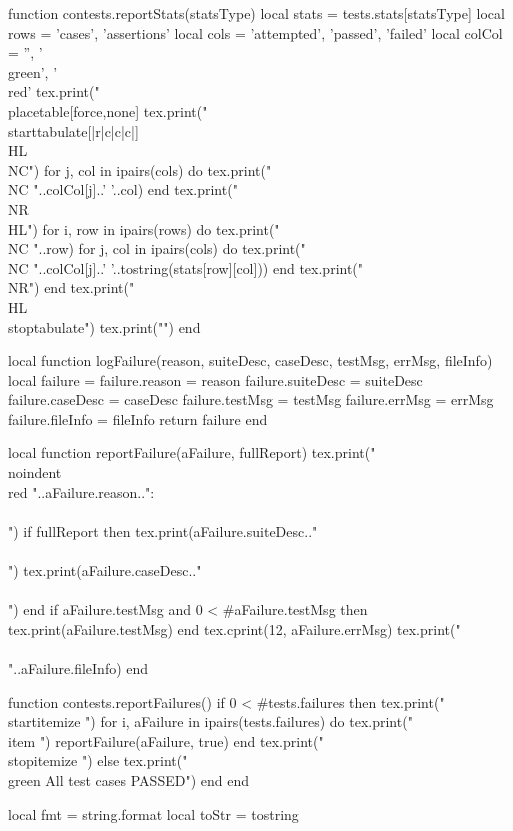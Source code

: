 function contests.reportStats(statsType)
  local stats = tests.stats[statsType]
  local rows = { 'cases', 'assertions' }
  local cols =
    { 'attempted', 'passed', 'failed' }
  local colCol = { '', '\\green', '\\red' }
  tex.print("\\placetable[force,none]{}{%
  tex.print("\\starttabulate[|r|c|c|c|]\\HL\\NC")
  for j, col in ipairs(cols) do
    tex.print("\\NC "..colCol[j]..' '..col)
  end
  tex.print("\\NR\\HL")
  for i, row in ipairs(rows) do
    tex.print("\\NC "..row)
    for j, col in ipairs(cols) do
      tex.print("\\NC "..colCol[j]..' '..tostring(stats[row][col]))
    end
    tex.print("\\NR")
  end
  tex.print("\\HL\\stoptabulate")
  tex.print("}")
end

local function logFailure(reason, suiteDesc, caseDesc,
                          testMsg, errMsg, fileInfo)
  local failure = {}
  failure.reason    = reason
  failure.suiteDesc = suiteDesc
  failure.caseDesc  = caseDesc
  failure.testMsg   = testMsg
  failure.errMsg    = errMsg
  failure.fileInfo  = fileInfo
  return failure
end

local function reportFailure(aFailure, fullReport)
  tex.print("\\noindent{\\red "..aFailure.reason.."}:\\\\")
  if fullReport then
    tex.print(aFailure.suiteDesc.."\\\\")
    tex.print(aFailure.caseDesc.."\\\\")
  end
  if aFailure.testMsg and 0 < #aFailure.testMsg then
    tex.print(aFailure.testMsg)
  end
  tex.cprint(12, aFailure.errMsg)
  tex.print("\\\\"..aFailure.fileInfo)
end

function contests.reportFailures()
  if 0 < #tests.failures then
    tex.print("\\startitemize ")
    for i, aFailure in ipairs(tests.failures) do
      tex.print("\\item ")
      reportFailure(aFailure, true)
    end
    tex.print("\\stopitemize ")
  else
    tex.print("{\\green All test cases PASSED}")
  end
end

local fmt   = string.format
local toStr = tostring

\stopLuaCode

\stopchapter